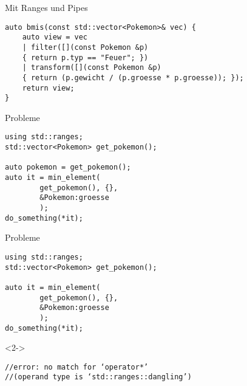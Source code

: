 \begin{frame}[fragile]{Mit Ranges und Pipes}
    \begin{verbatim}
auto bmis(const std::vector<Pokemon>& vec) {
    auto view = vec
    | filter([](const Pokemon &p)
    { return p.typ == "Feuer"; })
    | transform([](const Pokemon &p)
    { return (p.gewicht / (p.groesse * p.groesse)); });
    return view;
}
\end{verbatim}
\end{frame}

\begin{frame}[fragile]{Probleme}
    \begin{overlayarea}{\linewidth}{3cm}
        \begin{verbatim}
using std::ranges;
std::vector<Pokemon> get_pokemon();

auto pokemon = get_pokemon();
auto it = min_element(
        get_pokemon(), {},
        &Pokemon:groesse
        );
do_something(*it);
    \end{verbatim}
    \end{overlayarea}
\end{frame}

\begin{frame}[fragile]{Probleme}
    \begin{overlayarea}{\linewidth}{3cm}
        \begin{verbatim}
using std::ranges;
std::vector<Pokemon> get_pokemon();

auto it = min_element(
        get_pokemon(), {},
        &Pokemon:groesse
        );
do_something(*it);
    \end{verbatim}
        \begin{onlyenv}<2->
            \begin{verbatim}
//error: no match for ‘operator*’
//(operand type is ‘std::ranges::dangling’)
        \end{verbatim}
        \end{onlyenv}
    \end{overlayarea}
\end{frame}




